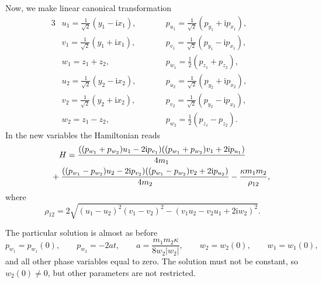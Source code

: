 \documentclass[11pt]{article}
\numberwithin{equation}{section}
\numberwithin{equation}{section}
\begin{document}
Now, we make linear canonical transformation
\begin{alignat*}{3}
 &u_1 = \frac{1}{\sqrt{2}}(y_1-\mathrm{i} x_1),\qquad&&
 p_{u_1} = \frac{1}{\sqrt{2}}(p_{y_1}+\mathrm{i}p_{x_1}),&
 \\
& v_1 = \frac{1}{\sqrt{2}}(y_1+\mathrm{i} x_1),\qquad&&
 p_{v_1} =\frac{1}{\sqrt{2}}(p_{y_1}-\mathrm{i}p_{x_1}),&
 \\
& w_1 = z_1 +z_2, \qquad &&
 p_{w_1} = \frac12(p_{z_1}+p_{z_2}),&
 \\
 &u_2 = \frac{1}{\sqrt{2}}(y_2-\mathrm{i} x_2),\qquad&&
 p_{u_2} = \frac{1}{\sqrt{2}}(p_{y_2}+\mathrm{i}p_{x_2}),&
 \\
 &v_2 = \frac{1}{\sqrt{2}}(y_2+\mathrm{i} x_2),\qquad&&
 p_{v_2} =\frac{1}{\sqrt{2}}(p_{y_2}-\mathrm{i}p_{x_2}),&
 \\
& w_2 = z_1 -z_2, \qquad&&
 p_{w_2} = \frac12(p_{z_1}-p_{z_2}).&
\end{alignat*}
In the new variables the Hamiltonian reads
\begin{gather*}
 H = \frac{((p_{w_1}+p_{w_2})u_1-2\mathrm{i}p_{v_1})
 ((p_{w_1}+p_{w_2})v_1+2\mathrm{i}p_{u_1})}{4m_1}
 \\ \hphantom{ H =}
{} + \frac{((p_{w_1}-p_{w_2})u_2-2\mathrm{i}p_{v_2})
 ((p_{w_1}-p_{w_2})v_2+2\mathrm{i}p_{u_2})}{4m_2} -\frac{\kappa m_1 m_2}{\rho_{12}},
\end{gather*}
where
\begin{equation*}
 \rho_{12} = 2\sqrt{(u_1-u_2)^2(v_1-v_2)^2-(v_1 u_2 - v_2 u_1 + 2\mathrm{i}w_2)^2}.
\end{equation*}

The particular solution is almost as before
\begin{equation*}
 p_{w_1}=p_{w_1}(0),\qquad
 p_{w_2} = -2at,\qquad
 a = \frac{m_1 m_2\kappa}{8w_2|w_2|},\qquad
 w_2=w_2(0), \qquad
 w_1=w_1(0),
\end{equation*}
and all other phase variables equal to zero. The solution must not be constant, so $w_2(0)\neq 0$, but other parameters are not restricted.
\end{document}
